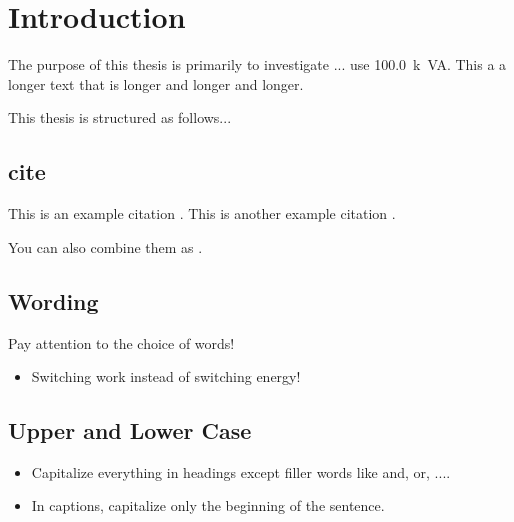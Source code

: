 \chapter{Introduction}
\label{cha:introduction}

The purpose of this thesis is primarily to investigate ... use \SI{100.0}{k VA}. This a a longer text that is longer and longer and longer.


This thesis is structured as follows...


\section{cite}

This is an example citation \cite{WaBo2016}. This is another example citation \cite{wallscheid2014real}.

You can also combine them as \cite{WaBo2016,wallscheid2014real}.


\section{Wording}
Pay attention to the choice of words!
\begin{itemize}
	\item Switching work instead of switching energy!
\end{itemize}

\section{Upper and Lower Case}
\begin{itemize}
    \item Capitalize everything in headings except filler words like and, or, ....
    \item In captions, capitalize only the beginning of the sentence.
\end{itemize}




